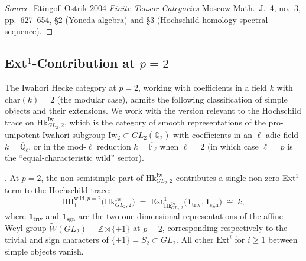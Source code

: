 \begin{proof}[Source]
Etingof--Ostrik 2004 \emph{Finite Tensor Categories} Moscow
Math.~J.~4, no.~3, pp.~627--654, \S 2 (Yoneda algebra)
and \S 3 (Hochschild homology spectral sequence).
\end{proof}

\subsection{Ext\({}^{1}\)-Contribution at \(p=2\)}

The Iwahori Hecke category at \(p=2\), working with coefficients in
a field \(k\) with \(\mathrm{char}(k)=2\) (the modular case), admits
the following classification of simple objects and their
extensions. We work with the version relevant to the Hochschild
trace on \(\mathrm{Hk}^{\mathrm{Iw}}_{GL_{2},2}\), which is the
category of smooth representations of the pro-unipotent Iwahori
subgroup Iw\({}_{2}\subset GL_{2}(\mathbb{Q}_{2})\) with coefficients
in an \(\ell\)-adic field \(k=\overline{\mathbb{Q}}_{\ell}\), or in the
mod-\(\ell\) reduction \(k=\overline{\mathbb{F}}_{\ell}\) when
\(\ell=2\) (in which case \(\ell=p\) is the ``equal-characteristic
wild'' sector).

\begin{proposition}[Ext\({}^{1}\) at \(p=2\)]
\label{v4-arith:bzn-rcompletion:prop:R4-Ext1-p2}
\ClaimStatusConjectured. At \(p=2\), the non-semisimple part of
\(\mathrm{Hk}^{\mathrm{Iw}}_{GL_{2},2}\) contributes a single
non-zero Ext\({}^{1}\)-term to the Hochschild trace:
\begin{equation}
\label{v4-arith:bzn-rcompletion:eq:Ext1-p2}
\mathrm{HH}_{1}^{\mathrm{wild},p=2}\bigl(\mathrm{Hk}^{\mathrm{Iw}}_{GL_{2},2}\bigr)
\;=\;\mathrm{Ext}^{1}_{\mathrm{Hk}^{\mathrm{Iw}}_{GL_{2},2}}\bigl(\mathbf{1}_{\mathrm{triv}},\mathbf{1}_{\mathrm{sgn}}\bigr)
\;\cong\;k,
\end{equation}
where \(\mathbf{1}_{\mathrm{triv}}\) and \(\mathbf{1}_{\mathrm{sgn}}\)
are the two one-dimensional representations of the affine Weyl
group \(\widetilde{W}(GL_{2})=\mathbb{Z}\rtimes\{\pm 1\}\) at \(p=2\),
corresponding respectively to the trivial and sign characters of
\(\{\pm 1\}=S_{2}\subset GL_{2}\). All other
\(\mathrm{Ext}^{i}\) for \(i\geq 1\) between simple objects vanish.
\end{proposition}


